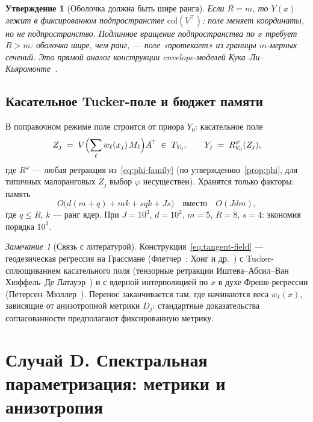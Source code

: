 \documentclass[11pt,a4paper]{article}
\newcommand{\T}{^{\!\top}}
\newcommand{\col}{\mathrm{col}}
\theoremstyle{plain}
\newtheorem{prop}[theorem]{Утверждение}
\theoremstyle{definition}
\theoremstyle{remark}
\newtheorem{remark}[theorem]{Замечание}
\begin{document}
\begin{prop}[Оболочка должна быть шире ранга]\label{prop:envelope}
Если $R=m$, то $Y(x)$ лежит в фиксированном подпространстве $\col(V\T)$:
поле меняет \emph{координаты}, но не \emph{подпространство}. Подлинное
вращение подпространства по $x$ требует $R>m$: оболочка шире, чем ранг,
--- поле «протекает» из границы $m$-мерных сечений. Это прямой аналог
конструкции envelope-моделей Кука--Ли--Кьяромонте~\cite{cook-2010-envelope}.
\end{prop}

\subsection{Касательное Tucker-поле и бюджет памяти}

В поправочном режиме поле строится от приора $Y_0$: касательное поле
\begin{equation}\label{eq:tangent-field}
Z_j\;=\;V\Bigl(\sum_{\ell} w_\ell(x_j)\,M_\ell\Bigr)A\T\;\in\;T_{Y_0},
\qquad
Y_j\;=\;R^\varphi_{Y_0}(Z_j),
\end{equation}
где $R^\varphi$ --- любая ретракция из~\eqref{eq:phi-family} (по
утверждению~\ref{prop:phi}, для типичных малоранговых $Z_j$ выбор $\varphi$
несуществен). Хранятся только факторы: память
\begin{equation}\label{eq:memory}
O\bigl(d(m+q)+m k+s q k+J s\bigr)\quad\text{вместо}\quad O(Jdm),
\end{equation}
где $q\le R$, $k$ --- ранг ядер. При $J=10^3$, $d=10^2$, $m=5$, $R=8$, $s=4$:
экономия порядка $10^3$.

\begin{remark}[Связь с литературой]
Конструкция~\eqref{eq:tangent-field} --- геодезическая регрессия на Грассмане
(Флетчер~\cite{fletcher-2011}; Хонг и др.~\cite{hong-grassmann-regression})
с Tucker-сплющиванием касательного поля (тензорные ретракции
Иштева--Абсил--Ван Хюффель--Де Латауэр~\cite{ishteva-2011}) и с ядерной
интерполяцией по $x$ в духе Фреше-регрессии
(Петерсен--Мюллер~\cite{petersen-mueller-2019}). Перенос заканчивается там, где
начинаются веса $w_\ell(x)$, зависящие от анизотропной метрики $D_j$:
стандартные доказательства согласованности предполагают фиксированную метрику.
\end{remark}

\section{Случай D. Спектральная параметризация: метрики и анизотропия}\label{sec:metric}
\end{document}
